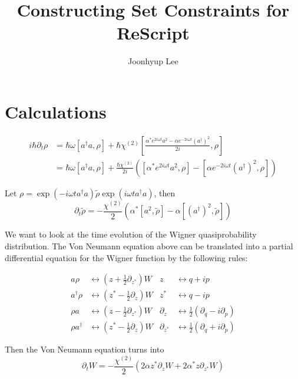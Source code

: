 \documentclass{article}
\title{Constructing Set Constraints for ReScript}
\author{Joonhyup Lee}
\date{}
\begin{document}
\maketitle

\section{Calculations}
\begin{align*}
  i\hbar\partial_{t}\rho &= \hbar\omega[a^{\dag}a, \rho]+\hbar\chi^{(2)}[\frac{\alpha^{*}e^{2i\omega t}a^{2}-\alpha e^{-2i\omega t}(a^{\dag})^{2}}{2i}, \rho]\\
                       &= \hbar\omega[a^{\dag}a, \rho]+\frac{\hbar\chi^{(2)}}{2i}([\alpha^{*}e^{2i\omega t}a^{2}, \rho]-[\alpha e^{-2i\omega t}(a^{\dag})^{2}, \rho])
\end{align*}

Let $\rho=\exp(-i\omega ta^{\dag}a)\tilde{\rho}\exp(i\omega ta^{\dag}a)$, then
\[\partial_{t}\tilde{\rho}=-\frac{\chi^{(2)}}{2}(\alpha^{*}[a^{2},\tilde{\rho}]-\alpha[(a^{\dag})^{2},\tilde{\rho}])\]

We want to look at the time evolution of the Wigner quasiprobability distribution. 
The Von Neumann equation above can be translated into a partial differential equation for the Wigner function by the following rules:

\begin{align*}
  a\rho&\leftrightarrow (z+\frac{1}{2}\partial_{z^{*}})W & z &\leftrightarrow q+ip\\
  a^{\dag}\rho&\leftrightarrow (z^{*}-\frac{1}{2}\partial_{z})W & z^{*} &\leftrightarrow q-ip\\
  \rho a&\leftrightarrow (z-\frac{1}{2}\partial_{z^{*}})W & \partial_{z} &\leftrightarrow \frac{1}{2}(\partial_{q}-i\partial_{p})\\
  \rho a^{\dag}&\leftrightarrow (z^{*}-\frac{1}{2}\partial_{z})W & \partial_{z^{*}} &\leftrightarrow \frac{1}{2}(\partial_{q}+i\partial_{p})
\end{align*}

Then the Von Neumann equation turns into
\[\partial_{t}W=-\frac{\chi^{(2)}}{2}(2\alpha z^{*}\partial_{z}W+2\alpha^{*}z\partial_{z^{*}}W)\]
\printbibliography
\end{document}
